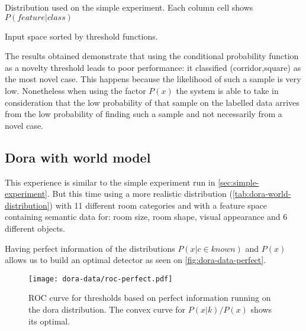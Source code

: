 \documentclass[a4paper]{article}
\begin{document}
\begin{table}[hb]
\begin{center}

\end{center}
\caption{\label{tab:simple-distribution}Distribution used on the simple experiment. Each column cell shows $P(feature|class)$}
\end{table}

\begin{table}
\centering
{}
\qquad
{}
\caption{\label{tab:simple-data-sorted}Input space sorted by threshold functions.}
\end{table}

The results obtained demonstrate that using the conditional probability function
as a novelty threshold leads to poor performance: it classified (corridor,square) as
the most novel case.
This happens because the likelihood of such a sample is very low.
Nonetheless when using the factor $P(x)$ the system is able to take in consideration
that the low probability of that sample on the labelled data arrives from the low
probability of finding such a sample and not necessarily from a novel case.


\clearpage
\subsection{Dora with world model}
\label{sec:dora-experiment}



This experience is similar to the simple experiment run in \autoref{sec:simple-experiment}.
But this time using a more realistic distribution (\autoref{tab:dora-world-distribution}) with
11 different room categories and with a feature space containing semantic data for:
room size, room shape, visual appearance and 6 different objects.

Having perfect information of the distributions $P(x|c \in known)$ and $P(x)$
allows us to build an optimal detector as seen on \autoref{fig:dora-data-perfect}.

\begin{figure}[h]
\centering
\texttt{[image: dora-data/roc-perfect.pdf]}
\caption{ROC curve for thresholds based on perfect information running on the dora distribution.
         The convex curve for $P(x|k)/P(x)$ shows its optimal.}
\label{fig:dora-data-perfect}
\end{figure}
\end{document}
